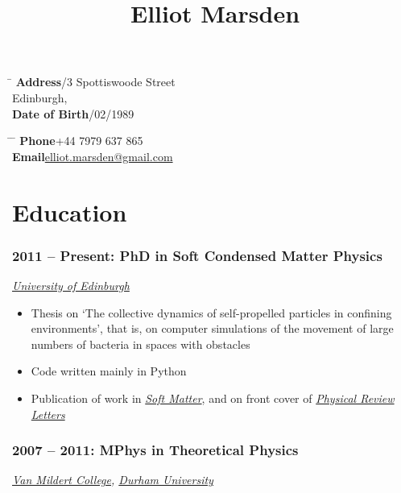 \documentclass[10pt]{article}
\begin{document}
    \title{Elliot Marsden}

    \parbox{0.5\textwidth}{
        \begin{tabbing}
            \hspace{3cm} \= \kill
            \textbf{Address}/3 Spottiswoode Street\\
            \>Edinburgh, \\
            \textbf{Date of Birth}/02/1989
        \end{tabbing}
    }
    \hfill
    \parbox{0.5\textwidth}{
        \begin{tabbing}
            \hspace{2cm} \= \hspace{4cm} \= \kill
            \textbf{Phone}\>+44 7979 637 865\\
            \textbf{Email}\>\href{mailto:elliot.marsden@gmail.com}{elliot.marsden@gmail.com}\\
        \end{tabbing}
    }

    \section{Education}

        \subsubsection{2011 -- Present: PhD in Soft Condensed Matter Physics}
            \textit{\href{http://www.ed.ac.uk/home}{University of Edinburgh}}

            \begin{itemize}
                \item Thesis on `The collective dynamics of self-propelled particles in confining environments', that is, on computer simulations of the movement of large numbers of bacteria in spaces with obstacles
                \item Code written mainly in Python
                \item Publication of work in \textit{\href{http://dx.doi.org/10.1039/C3SM52358F}{Soft Matter}}, and on front cover of \textit{\href{http://dx.doi.org/10.1103/PhysRevLett.113.268101}{Physical Review Letters}}
            \end{itemize}

        \subsubsection{2007 -- 2011: MPhys in Theoretical Physics}
            \textit{\href{http://www.dur.ac.uk/van-mildert.college}{Van Mildert College}, \href{http://www.dur.ac.uk}{Durham University}}
\end{document}
